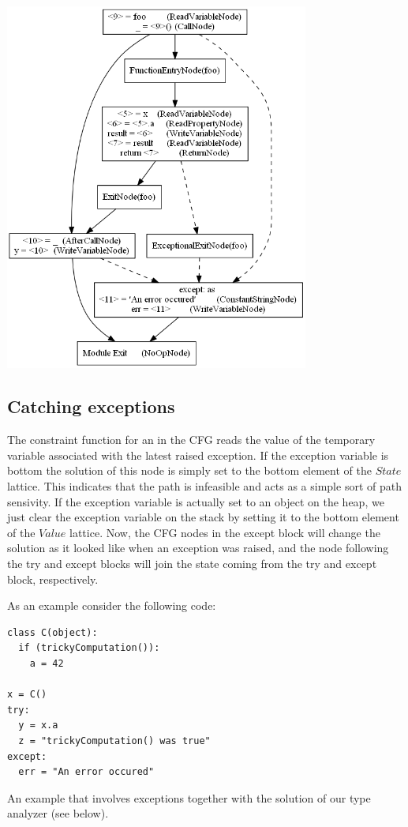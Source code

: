 \begin{listing}[H]
	\begin{center}
		\includegraphics[width=0.75\textwidth]{images/exception1.png}
	\end{center}
	\vspace{-10pt}
\end{listing}


\subsection{Catching exceptions}
The constraint function for an  in the CFG reads the value of the temporary variable associated with the latest raised exception. If the exception variable is bottom the solution of this node is simply set to the bottom element of the $State$ lattice. This indicates that the path is infeasible and acts as a simple sort of path sensivity. If the exception variable is actually set to an object on the heap, we just clear the exception variable on the stack by setting it to the bottom element of the $Value$ lattice. Now, the CFG nodes in the except block will change the solution as it looked like when an exception was raised, and the node following the try and except blocks will join the state coming from the try and except block, respectively.

As an example consider the following code:

\begin{listing}[H]
	\begin{verbatim}
class C(object):
  if (trickyComputation()):
    a = 42

x = C()
try:
  y = x.a
  z = "trickyComputation() was true"
except:
  err = "An error occured"
	\end{verbatim}
	\caption{An example that involves exceptions together with the solution of our type analyzer (see below).}
\end{listing}


